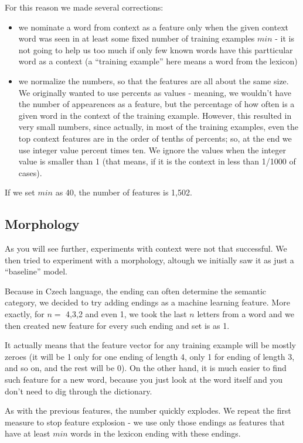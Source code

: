 \documentclass[letterpaper]{article}
\begin{document}
For this reason we made several corrections:
\begin{itemize}
    \item we nominate a word from context as a feature only when the given context word was seen in at least some fixed number of training examples $min$ - it is not going to help us too much 
if only few known words have this partticular word as a context (a ``training example'' here means a word from the lexicon)
    
    \item we normalize the numbers, so that the features are all about 
the same size. We originally wanted to use percents as values - meaning, 
we wouldn't have the number of appearences as a feature, but the percentage of how often is a given word in the context of the training example.    
     However, this resulted in very small numbers, since actually, 
in most of the training examples, even the top context features are in the order of 
tenths of percents; so, at the end we use integer value percent times ten. 
We ignore the values when the integer value is smaller than 1 (that means, if it is the context in less than 1/1000 of cases).
     

\end{itemize}

If we set $min$ as 40, the number of features is 1,502.

\subsection{Morphology}
As you will see further, experiments with context were not that successful. 
We then tried to experiment with a morphology, altough we initially saw it as just a ``baseline'' model.

Because in Czech language, the ending can often determine the semantic category, 
we decided to try adding endings as a machine learning feature. 
More exactly, for $n=$ 4,3,2 and even 1, we took the last $n$ letters from 
a word and we then created new feature for every such ending and set is as 1.

It actually means that the feature vector for any training example will be mostly zeroes 
(it will be 1 only for one ending of length 4, only 1 for ending of length 3, and so on, 
and the rest will be 0). On the other hand, it is much easier to find such feature 
for a new word, because you just look at the word itself and you don't need to dig through the dictionary.

As with the previous features, the number quickly explodes. We repeat the first measure 
to stop feature explosion - we use only those endings as features that have at least $min$ words in the lexicon ending with these endings.
\end{document}
